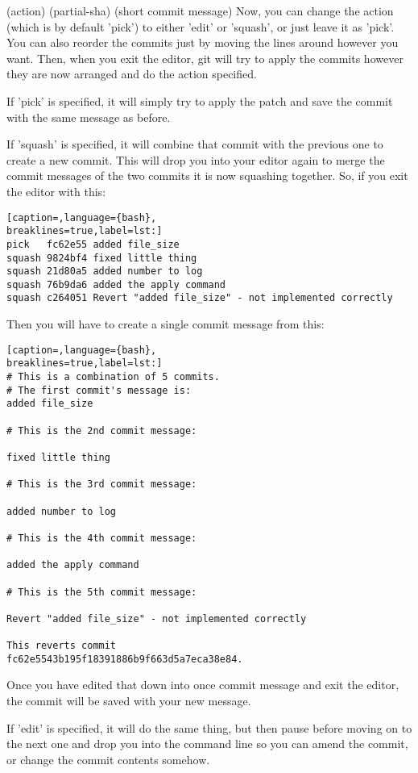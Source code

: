 (action) (partial-sha) (short commit message)
Now, you can change the action (which is by default 'pick') to either 'edit' or
'squash', or just leave it as 'pick'. You can also reorder the commits just by
moving the lines around however you want. Then, when you exit the editor, git
will try to apply the commits however they are now arranged and do the action
specified.

If 'pick' is specified, it will simply try to apply the patch and save the
commit with the same message as before.

If 'squash' is specified, it will combine that commit with the previous one to
create a new commit. This will drop you into your editor again to merge the
commit messages of the two commits it is now squashing together. So, if you
exit the editor with this:
\lstset{basicstyle=\scriptsize, numbers=none, captionpos=b, tabsize=4}
\begin{lstlisting}[caption=,language={bash},
breaklines=true,label=lst:]
pick   fc62e55 added file_size
squash 9824bf4 fixed little thing
squash 21d80a5 added number to log
squash 76b9da6 added the apply command
squash c264051 Revert "added file_size" - not implemented correctly
\end{lstlisting}

Then you will have to create a single commit message from this:
\lstset{basicstyle=\scriptsize, numbers=none, captionpos=b, tabsize=4}
\begin{lstlisting}[caption=,language={bash},
breaklines=true,label=lst:]
# This is a combination of 5 commits.
# The first commit's message is:
added file_size

# This is the 2nd commit message:

fixed little thing

# This is the 3rd commit message:

added number to log

# This is the 4th commit message:

added the apply command

# This is the 5th commit message:

Revert "added file_size" - not implemented correctly

This reverts commit
fc62e5543b195f18391886b9f663d5a7eca38e84.
\end{lstlisting}

Once you have edited that down into once commit message and exit the editor,
the commit will be saved with your new message.

If 'edit' is specified, it will do the same thing, but then pause before moving
on to the next one and drop you into the command line so you can amend the
commit, or change the commit contents somehow.

